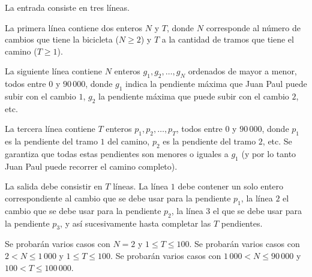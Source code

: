 \documentclass{oci}
\begin{document}
\begin{inputDescription}
La entrada consiste en tres líneas.

La primera línea contiene dos enteros $N$ y $T$, donde $N$ corresponde
al número de cambios que tiene la bicicleta ($N\geq 2$) y $T$ a la cantidad
de tramos que tiene el camino ($T\geq 1$).

La siguiente línea contiene $N$ enteros $g_1,g_2,\ldots, g_N$ ordenados de mayor
a menor, todos entre $0$ y $90\,000$, donde $g_1$ indica la pendiente máxima que
Juan Paul puede subir con el cambio $1$, $g_2$ la pendiente máxima que puede
subir con el cambio $2$, etc.

La tercera línea contiene $T$ enteros $p_1,p_2,\ldots,p_T$, todos entre $0$ y $90\,000$, 
donde $p_1$ es la pendiente del tramo $1$ del camino, $p_2$ es la pendiente
del tramo $2$, etc.
Se garantiza que todas estas pendientes son menores o iguales a $g_1$ (y por lo tanto Juan Paul
puede recorrer el camino completo).
\end{inputDescription}

\begin{outputDescription}
La salida debe consistir en $T$ líneas.
La línea $1$ debe contener un solo entero correspondiente al cambio que se debe usar para la pendiente $p_1$,
la línea $2$ el cambio que se debe usar para la pendiente $p_2$, la línea $3$ el que se debe usar 
para la pendiente $p_3$, y así sucesivamente hasta completar las $T$ pendientes.
\end{outputDescription}

\begin{scoreDescription}
   Se probarán varios casos con $N=2$ y $1\leq T\leq 100$.
   Se probarán varios casos con $2 < N \leq 1\,000$ y $1\leq T\leq 100$.
   Se probarán varios casos con $1\,000< N \leq 90\,000$ y $100 <
  T\leq 100\,000$.
\end{scoreDescription}

\begin{sampleDescription}
\end{sampleDescription}
\end{document}
